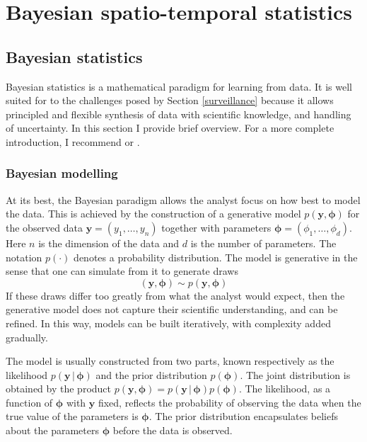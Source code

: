 \documentclass[a4paper, nobind]{templates/ociamthesis}
\begin{document}
\hypertarget{bayes-st}{%
\chapter{Bayesian spatio-temporal statistics}\label{bayes-st}}

\adjustmtc
{}

\hypertarget{bayesian-statistics}{%
\section{Bayesian statistics}\label{bayesian-statistics}}

Bayesian statistics is a mathematical paradigm for learning from data.
It is well suited for to the challenges posed by Section \ref{surveillance} because it allows principled and flexible synthesis of data with scientific knowledge, and handling of uncertainty.
In this section I provide brief overview.
For a more complete introduction, I recommend \textcite{mcelreath2020statistical} or \textcite{gelman2013bayesian}.

\hypertarget{bayesian-modelling}{%
\subsection{Bayesian modelling}\label{bayesian-modelling}}

At its best, the Bayesian paradigm allows the analyst focus on how best to model the data.
This is achieved by the construction of a generative model \(p(\mathbf{y}, \boldsymbol{\mathbf{\phi}})\) for the observed data \(\mathbf{y} = (y_1, \ldots, y_n)\) together with parameters \(\boldsymbol{\mathbf{\phi}} = (\phi_1, \ldots, \phi_d)\).
Here \(n\) is the dimension of the data and \(d\) is the number of parameters.
The notation \(p(\cdot)\) denotes a probability distribution.
The model is generative in the sense that one can simulate from it to generate draws
\begin{equation}
(\mathbf{y}, \boldsymbol{\mathbf{\phi}}) \sim p(\mathbf{y}, \boldsymbol{\mathbf{\phi}})
\end{equation}
If these draws differ too greatly from what the analyst would expect, then the generative model does not capture their scientific understanding, and can be refined.
In this way, models can be built iteratively, with complexity added gradually.

The model is usually constructed from two parts, known respectively as the likelihood \(p(\mathbf{y} \, | \, \boldsymbol{\mathbf{\phi}})\) and the prior distribution \(p(\boldsymbol{\mathbf{\phi}})\).
The joint distribution is obtained by the product \(p(\mathbf{y}, \boldsymbol{\mathbf{\phi}}) = p(\mathbf{y} \, | \, \boldsymbol{\mathbf{\phi}}) p(\boldsymbol{\mathbf{\phi}})\).
The likelihood, as a function of \(\boldsymbol{\mathbf{\phi}}\) with \(\mathbf{y}\) fixed, reflects the probability of observing the data when the true value of the parameters is \(\boldsymbol{\mathbf{\phi}}\).
The prior distribution encapsulates beliefs about the parameters \(\boldsymbol{\mathbf{\phi}}\) before the data is observed.
\end{document}
